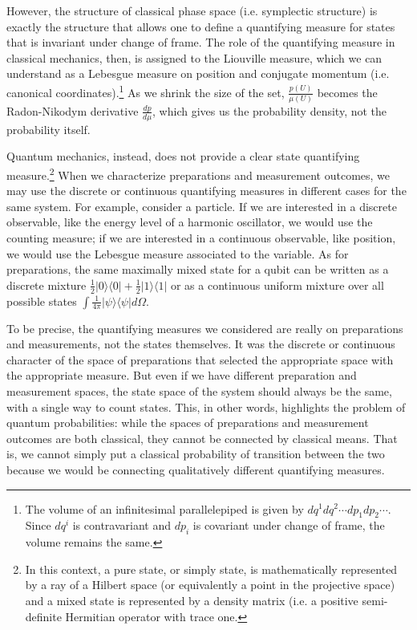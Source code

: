 \documentclass[entropy,article,submit,pdftex,moreauthors]{Definitions/mdpi}
\def\>{\rangle}
\def\<{\langle}
\begin{document}
However, the structure of classical phase space (i.e. symplectic structure) is exactly the structure that allows one to define a quantifying measure for states that is invariant under change of frame.\cite{aop-book,aop-phil-Hamiltonianinformation,aop-phil-HamiltonianPrivilege} The role of the quantifying measure in classical mechanics, then, is assigned to the Liouville measure, which we can understand as a Lebesgue measure on position and conjugate momentum (i.e. canonical coordinates).\footnote{The volume of an infinitesimal parallelepiped is given by $dq^1 dq^2 \cdots dp_1 dp_2 \cdots$. Since $dq^i$ is contravariant and $dp_i$ is covariant under change of frame, the volume remains the same.} As we shrink the size of the set, $\frac{p(U)}{\mu(U)}$ becomes the Radon-Nikodym derivative $\frac{dp}{d\mu}$, which gives us the probability density, not the probability itself.


Quantum mechanics, instead, does not provide a clear state quantifying measure.\footnote{In this context, a pure state, or simply state, is mathematically represented by a ray of a Hilbert space (or equivalently a point in the projective space) and a mixed state is represented by a density matrix (i.e. a positive semi-definite Hermitian operator with trace one.} When we characterize preparations and measurement outcomes, we may use the discrete or continuous quantifying measures in different cases for the same system. For example, consider a particle. If we are interested in a discrete observable, like the energy level of a harmonic oscillator, we would use the counting measure; if we are interested in a continuous observable, like position, we would use the Lebesgue measure associated to the variable. As for preparations, the same maximally mixed state for a qubit can be written as a discrete mixture $\frac{1}{2} | 0 \> \< 0 | + \frac{1}{2} | 1 \> \< 1 | $ or as a continuous uniform mixture over all possible states $\int \frac{1}{4\pi} | \psi \> \< \psi | d\Omega$.

To be precise, the quantifying measures we considered are really on preparations and measurements, not the states themselves. It was the discrete or continuous character of the space of preparations that selected the appropriate space with the appropriate measure. But even if we have different preparation and measurement spaces, the state space of the system should always be the same, with a single way to count states. This, in other words, highlights the problem of quantum probabilities: while the spaces of preparations and measurement outcomes are both classical, they cannot be connected by classical means. That is, we cannot simply put a classical probability of transition between the two because we would be connecting qualitatively different quantifying measures.
\end{document}
